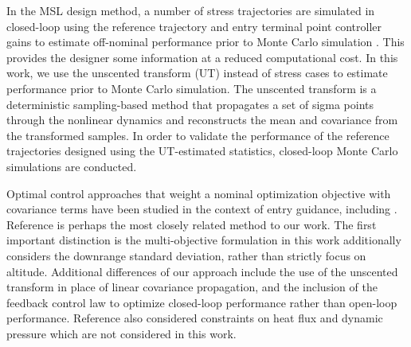 \documentclass[journal ]{new-aiaa}
\begin{document}
In the MSL design method, a number of stress trajectories are simulated in closed-loop using the reference trajectory and entry terminal point controller gains to estimate off-nominal performance prior to Monte Carlo simulation \cite{MSL_EDL2}. This provides the designer some information at a reduced computational cost. In this work, we use the unscented transform (UT) \cite{UT1997} instead of stress cases to estimate performance prior to Monte Carlo simulation. The unscented transform is a deterministic sampling-based method that propagates a set of sigma points through the nonlinear dynamics and reconstructs the mean and covariance from the transformed samples. In order to validate the performance of the reference trajectories designed using the UT-estimated statistics, closed-loop Monte Carlo simulations are conducted.

Optimal control approaches that weight a nominal optimization objective with covariance terms have been studied in the context of entry guidance, including \cite{AltitudeUnderUncertainty, MarsEntryDesensitized, EntryOUUThesis1, EntryOUUThesis2, EntryOUU}.
Reference \cite{AltitudeUnderUncertainty} is perhaps the most closely related method to our work. The first important distinction is the multi-objective formulation in this work additionally considers the downrange standard deviation, rather than strictly focus on altitude. Additional differences of our approach include the use of the unscented transform in place of linear covariance propagation, and the inclusion of the feedback control law to optimize closed-loop performance rather than open-loop performance. Reference \cite{AltitudeUnderUncertainty} also considered constraints on heat flux and dynamic pressure which are not considered in this work. 
\end{document}
